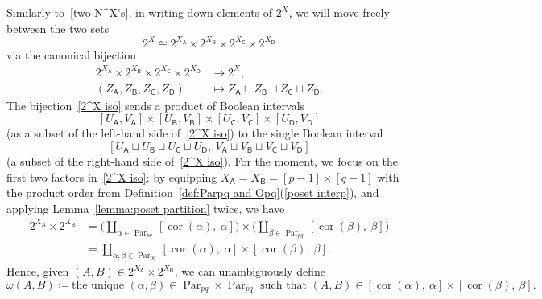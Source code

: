 \documentclass[noamsfonts,10pt]{amsart}
\newcommand{\al}{\alpha}
\newcommand{\be}{\beta}
\DeclareMathOperator{\cor}{cor}
\DeclareMathOperator{\Par}{Par}
\newcommand{\sA}{\mathsf{A}}
\newcommand{\sB}{\mathsf{B}}
\newcommand{\sC}{\mathsf{C}}
\newcommand{\sD}{\mathsf{D}}
\newcommand{\1}{\mathbf{1}}
\theoremstyle{plain}
\theoremstyle{definition}
\numberwithin{equation}{section}
\begin{document}
Similarly to~\eqref{two N^X's}, in writing down elements of $2^X$, we will move freely between the two sets
    \begin{equation}
        \label{two 2^X's}
        2^X \cong 2^{X_{\sA}} \times 2^{X_{\sB}} \times 2^{X_{\sC}}  \times 2^{X_{\sD}}
    \end{equation}
via the canonical bijection
    \begin{equation}
        \label{2^X iso}
        \begin{split}
        2^{X_{\sA}} \times 2^{X_{\sB}} \times 2^{X_{\sC}} \times  2^{X_{\sD}} & \longrightarrow 2^{X}, \\
        (Z_{\sA}, Z_{\sB}, Z_{\sC}, Z_{\sD}) & \longmapsto Z_{\sA} \sqcup Z_{\sB} \sqcup Z_{\sC} \sqcup Z_{\sD}.
        \end{split}
    \end{equation}
The bijection~\eqref{2^X iso} sends a product of Boolean intervals 
    \begin{equation}
        \label{product of Booleans}
        [U_{\sA}, V_{\sA}] \times [U_{\sB}, V_{\sB}] \times [U_{\sC}, V_{\sC}] \times [U_{\sD}, V_{\sD}]
    \end{equation}
(as a subset of the left-hand side of~\eqref{2^X iso}) to the single Boolean interval
    \begin{equation}
        \label{single Boolean}
        [U_{\sA} \sqcup U_{\sB} \sqcup U_{\sC} \sqcup U_{\sD}, \: V_{\sA} \sqcup V_{\sB} \sqcup V_{\sC} \sqcup V_{\sD}]
    \end{equation}
(a subset of the right-hand side of~\eqref{2^X iso}).
For the moment, we focus on the first two factors in~\eqref{2^X iso}:
by equipping $X_{\sA} = X_{\sB} = [p-1] \times [q-1]$ with the product order from Definition~\ref{def:Parpq and Opq}(\ref{poset interp}), and applying Lemma~\ref{lemma:poset partition} twice, we have
\begin{equation}
    \label{2^A partition}
    \begin{split}
        2^{X_{\sA}} \times 2^{X_{\sB}} &= \Bigg(\coprod_{\al \in \Par_{pq}} [\cor(\al), \: \al]\Bigg) \times \Bigg(\coprod_{\be \in \Par_{pq}} [\cor(\be), \: \be]\Bigg) \\
        &= \coprod_{\al, \be \in \Par_{pq}} [\cor(\al), \: \al] \times [\cor(\be), \: \be].
    \end{split}
\end{equation}
Hence, given $(A,B) \in 2^{X_{\sA}} \times 2^{X_{\sB}}$, we can unambiguously define
\begin{equation}
    \label{omega(A,B)}
    \omega(A,B) \coloneqq \text{the unique $(\al, \be) \in \Par_{pq} \times \Par_{pq}$ such that $(A,B) \in [\cor(\al), \: \al] \times [\cor(\be), \: \be]$}.
\end{equation}
\end{document}
